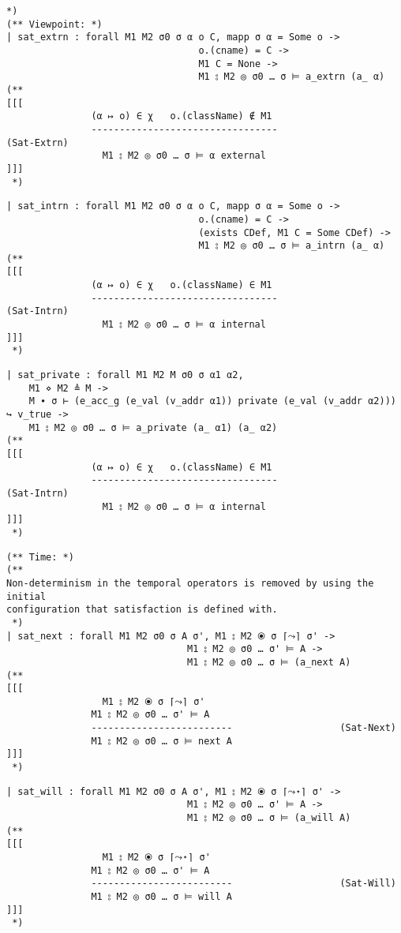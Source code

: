 \documentclass[12pt]{article}
\begin{document}
\begin{verbatim}
*)
(** Viewpoint: *)
| sat_extrn : forall M1 M2 σ0 σ α o C, mapp σ α = Some o ->
                                  o.(cname) = C ->
                                  M1 C = None ->
                                  M1 ⦂ M2 ◎ σ0 … σ ⊨ a_extrn (a_ α)
(**
[[[
               (α ↦ o) ∈ χ   o.(className) ∉ M1
               ---------------------------------                   (Sat-Extrn)
                 M1 ⦂ M2 ◎ σ0 … σ ⊨ α external
]]]
 *)
\end{verbatim}
\begin{verbatim}
| sat_intrn : forall M1 M2 σ0 σ α o C, mapp σ α = Some o ->
                                  o.(cname) = C ->
                                  (exists CDef, M1 C = Some CDef) ->
                                  M1 ⦂ M2 ◎ σ0 … σ ⊨ a_intrn (a_ α)
(**
[[[
               (α ↦ o) ∈ χ   o.(className) ∈ M1
               ---------------------------------                   (Sat-Intrn)
                 M1 ⦂ M2 ◎ σ0 … σ ⊨ α internal
]]]
 *)
\end{verbatim}
\begin{verbatim}
| sat_private : forall M1 M2 M σ0 σ α1 α2,
    M1 ⋄ M2 ≜ M ->
    M ∙ σ ⊢ (e_acc_g (e_val (v_addr α1)) private (e_val (v_addr α2))) ↪ v_true ->
    M1 ⦂ M2 ◎ σ0 … σ ⊨ a_private (a_ α1) (a_ α2)
(**
[[[
               (α ↦ o) ∈ χ   o.(className) ∈ M1
               ---------------------------------                   (Sat-Intrn)
                 M1 ⦂ M2 ◎ σ0 … σ ⊨ α internal
]]]
 *)
\end{verbatim}
\begin{verbatim}
(** Time: *)
(**
Non-determinism in the temporal operators is removed by using the initial
configuration that satisfaction is defined with.
 *)
| sat_next : forall M1 M2 σ0 σ A σ', M1 ⦂ M2 ⦿ σ ⌈⤳⌉ σ' ->
                                M1 ⦂ M2 ◎ σ0 … σ' ⊨ A ->
                                M1 ⦂ M2 ◎ σ0 … σ ⊨ (a_next A)
(**
[[[
                 M1 ⦂ M2 ⦿ σ ⌈⤳⌉ σ'
               M1 ⦂ M2 ◎ σ0 … σ' ⊨ A
               -------------------------                   (Sat-Next)
               M1 ⦂ M2 ◎ σ0 … σ ⊨ next A
]]]
 *)
\end{verbatim}
\begin{verbatim}
| sat_will : forall M1 M2 σ0 σ A σ', M1 ⦂ M2 ⦿ σ ⌈⤳⋆⌉ σ' ->
                                M1 ⦂ M2 ◎ σ0 … σ' ⊨ A ->
                                M1 ⦂ M2 ◎ σ0 … σ ⊨ (a_will A)
(**
[[[
                 M1 ⦂ M2 ⦿ σ ⌈⤳⋆⌉ σ'
               M1 ⦂ M2 ◎ σ0 … σ' ⊨ A
               -------------------------                   (Sat-Will)
               M1 ⦂ M2 ◎ σ0 … σ ⊨ will A
]]]
 *)
\end{verbatim}
\end{document}
